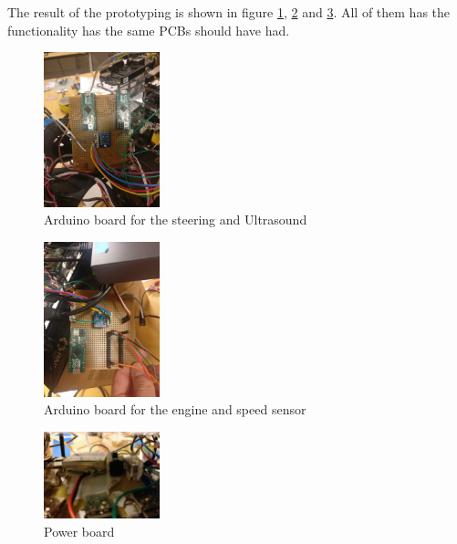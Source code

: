 \documentclass[11pt, titlepage]{article} %
\begin{document}
The result of the prototyping is shown in figure \ref{fig:board_ultra_steering}, \ref{fig:board_speed_engine} and \ref{fig:power_board}. All of them has the functionality has the same PCBs should have had. 


\begin{figure}
	\includegraphics[width=0.3\textwidth]{arduino1.jpg}
	\caption{Arduino board for the steering and Ultrasound}
	\label{fig:board_ultra_steering}
\end{figure}

\begin{figure}
	\includegraphics[width=0.3\textwidth]{arduino2.jpg}
	\caption{Arduino board for the engine and speed sensor}
	\label{fig:board_speed_engine}
\end{figure}

\begin{figure}
	\includegraphics[width=0.3\textwidth]{power_board.jpg}
	\caption{Power board}
	\label{fig:power_board}
\end{figure}



\end{document}
